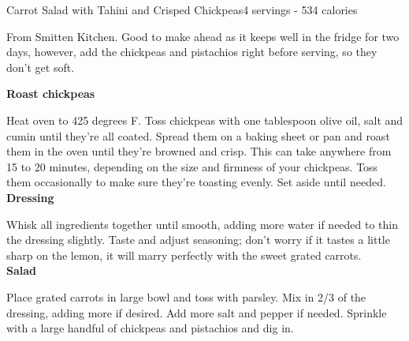 \begin{recipe}{Carrot Salad with Tahini and Crisped Chickpeas}{4 servings - 534 calories}{}

\freeform From Smitten Kitchen. Good to make ahead as it keeps well in the fridge for two days, however, add the chickpeas and pistachios right before serving, so they don’t get soft.


\textbf{Roast chickpeas}

Heat oven to 425 degrees F. Toss chickpeas with one tablespoon olive oil, salt and cumin until they’re all coated. Spread them on a baking sheet or pan and roast them in the oven until they’re browned and crisp. This can take anywhere from 15 to 20 minutes, depending on the size and firmness of your chickpeas. Toss them occasionally to make sure they’re toasting evenly. Set aside until needed.\\

\textbf{Dressing}

Whisk all ingredients together until smooth, adding more water if needed to thin the dressing slightly. Taste and adjust seasoning; don’t worry if it tastes a little sharp on the lemon, it will marry perfectly with the sweet grated carrots.\\

\textbf{Salad}

Place grated carrots in large bowl and toss with parsley. Mix in 2/3 of the dressing, adding more if desired. Add more salt and pepper if needed. Sprinkle with a large handful of chickpeas and pistachios and dig in.

\end{recipe}